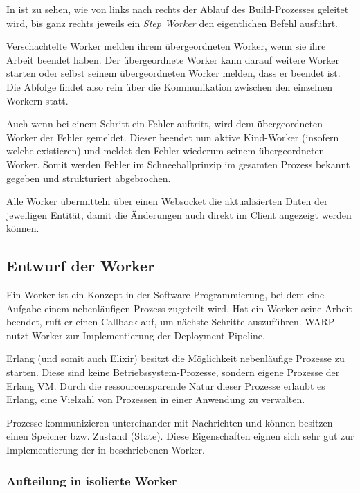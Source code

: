 In  ist zu sehen, wie von links nach rechts der Ablauf des Build-Prozesses geleitet wird, bis ganz rechts jeweils ein \emph{Step Worker} den eigentlichen Befehl ausführt.

Verschachtelte Worker melden ihrem übergeordneten Worker, wenn sie ihre Arbeit beendet haben. Der übergeordnete Worker kann darauf weitere Worker starten oder selbst seinem übergeordneten Worker melden, dass er beendet ist. Die Abfolge findet also rein über die Kommunikation zwischen den einzelnen Workern statt.

Auch wenn bei einem Schritt ein Fehler auftritt, wird dem übergeordneten Worker der Fehler gemeldet. Dieser beendet nun aktive Kind-Worker (insofern welche existieren) und meldet den Fehler wiederum seinem übergeordneten Worker. Somit werden Fehler im Schneeballprinzip im gesamten Prozess bekannt gegeben und strukturiert abgebrochen.

Alle Worker übermitteln über einen Websocket die aktualisierten Daten der jeweiligen Entität, damit die Änderungen auch direkt im Client angezeigt werden können.

\subsection{Entwurf der Worker}

Ein Worker ist ein Konzept in der Software-Programmierung, bei dem eine Aufgabe einem nebenläufigen Prozess zugeteilt wird. Hat ein Worker seine Arbeit beendet, ruft er einen Callback auf, um nächste Schritte auszuführen. WARP nutzt Worker zur Implementierung der Deployment-Pipeline.

Erlang (und somit auch Elixir) besitzt die Möglichkeit nebenläufige Prozesse zu starten. Diese sind keine Betriebssystem-Prozesse, sondern eigene Prozesse der Erlang VM. Durch die ressourcensparende Natur dieser Prozesse erlaubt es Erlang, eine Vielzahl von Prozessen in einer Anwendung zu verwalten. \citep[133]{Armstrong2007}

Prozesse kommunizieren untereinander mit Nachrichten und können besitzen einen Speicher bzw. Zustand (State). Diese Eigenschaften eignen sich sehr gut zur Implementierung der in  beschriebenen Worker.

\subsubsection{Aufteilung in isolierte Worker}
\label{subsec:aufteilung-der-worker}


